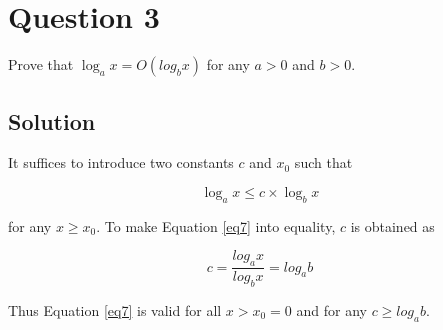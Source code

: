 
\section*{Question 3}

Prove that $\log_a x = O(log_b x)$ for any $a > 0$ and $b > 0$.

\subsection*{Solution}
It suffices to introduce two constants $c$ and $x_0$ such that

\begin{equation}
\log_a x \leq c\times \log_b x
\label{eq7}
\end{equation}

for any $x \geq x_0$.
To make Equation \ref{eq7} into equality, $c$ is obtained as

\begin{equation}
c = \frac{log_a x}{log_b x} = log_a b
\end{equation}

Thus Equation \ref{eq7} is valid for all $x > x_0 = 0$ and for any $c \geq log_a b$.
